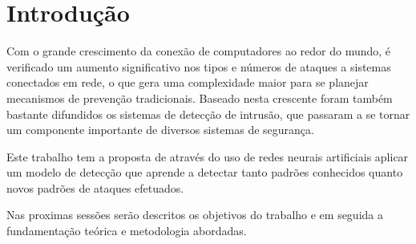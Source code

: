 \chapter*[Introdução]{Introdução}

Com o grande crescimento da conexão de computadores ao redor do mundo, é verificado um aumento significativo nos tipos e números de ataques a sistemas conectados em rede, o que gera uma complexidade maior para se planejar mecanismos de prevenção tradicionais. Baseado nesta crescente foram também bastante difundidos os sistemas de detecção de intrusão, que passaram a se tornar um componente importante de diversos sistemas de segurança.

Este trabalho tem a proposta de através do uso de redes neurais artificiais aplicar um modelo de detecção que aprende a detectar tanto padrões conhecidos quanto novos padrões de  ataques efetuados.

Nas proximas sessões serão descritos os objetivos do trabalho e em seguida a fundamentação teórica e metodologia abordadas.